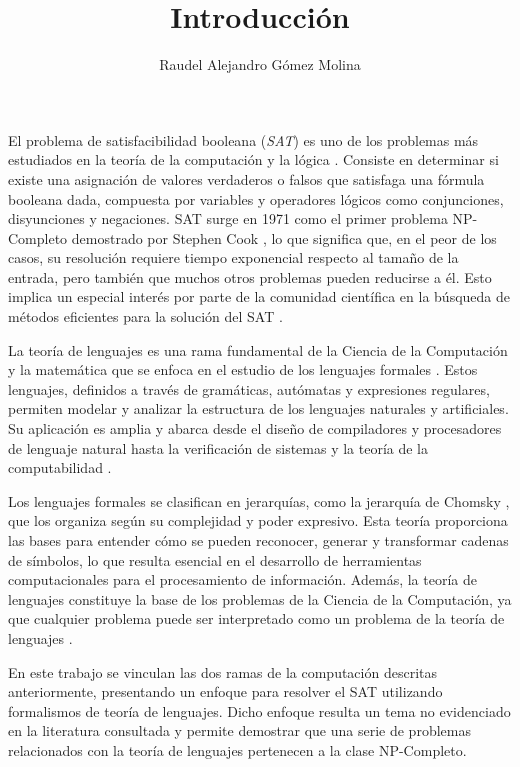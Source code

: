 \documentclass[12pt]{article}
\title{Introducción}
\author{Raudel Alejandro Gómez Molina}
\begin{document}
\maketitle

El problema de satisfacibilidad booleana (\textit{SAT}) \cite{authomataTheory} es uno de los problemas más estudiados en 
la teoría de la computación y la lógica \cite{biere2021handbook}.  Consiste en determinar si existe una asignación 
de valores verdaderos o falsos que satisfaga una fórmula booleana dada, compuesta por variables y operadores 
lógicos como conjunciones, disyunciones y negaciones. SAT surge en 1971 como el primer problema NP-Completo 
demostrado por Stephen Cook \cite{Cook1971}, lo que significa que, en el peor de los casos, su resolución 
requiere tiempo exponencial respecto al tamaño de la entrada, pero también que muchos otros problemas pueden 
reducirse a él. Esto implica un especial interés por parte de la comunidad científica en la búsqueda de 
métodos eficientes para la solución del SAT \cite{biere2021handbook}.

La teoría de lenguajes es una rama fundamental de la Ciencia de la Computación y la matemática que se enfoca 
en el estudio de los lenguajes formales \cite{authomataTheory}. Estos lenguajes, definidos a través de 
gramáticas, autómatas y expresiones regulares, permiten modelar y analizar la estructura de los lenguajes 
naturales y artificiales. Su aplicación es amplia y abarca desde el diseño de compiladores y procesadores de 
lenguaje natural hasta la verificación de sistemas y la teoría de la computabilidad \cite{authomataTheory}.

Los lenguajes formales se clasifican en jerarquías, como la jerarquía de Chomsky \cite{hunter2020chomsky}, 
que los organiza según su complejidad y poder expresivo. Esta teoría proporciona las bases para 
entender cómo se pueden reconocer, generar y transformar cadenas de símbolos, lo que resulta esencial 
en el desarrollo de herramientas computacionales para el procesamiento de información. Además, 
la teoría de lenguajes constituye la base de los problemas de la Ciencia de la Computación, ya que 
cualquier problema puede ser interpretado como un problema de la teoría de lenguajes \cite{authomataTheory}.

En este trabajo se vinculan las dos ramas de la computación descritas anteriormente, presentando 
un enfoque para resolver el SAT utilizando formalismos de teoría de lenguajes. Dicho enfoque resulta un 
tema no evidenciado en la literatura consultada y permite demostrar que una serie de problemas 
relacionados con la teoría de lenguajes pertenecen a la clase NP-Completo.
\end{document}
